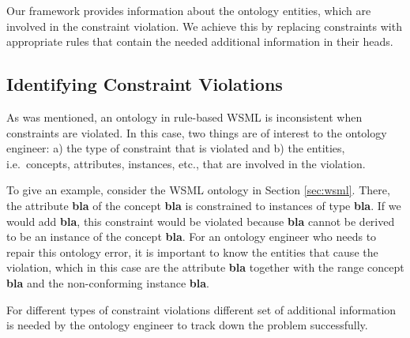 Our framework provides information about the ontology entities, which are involved in the constraint violation. We achieve this by replacing constraints with appropriate rules that contain the needed additional information in their heads.

\subsection{Identifying Constraint Violations}

As was mentioned, an ontology in rule-based WSML is inconsistent when constraints
are violated. In this case, two
things are of interest to the ontology engineer: a) the type of
constraint that is violated and b) the entities, i.e.\ concepts,
attributes, instances, etc., that are involved in the violation.

\def\bla{\textbf{{\sf bla}}\xspace}
To give an example, consider the WSML ontology in Section
\ref{sec:wsml}. There, the attribute \bla of the concept \bla is
constrained to instances of type \bla. If we would add \bla, this
constraint would be violated because \bla cannot be derived to be
an instance of the concept \bla. For an ontology engineer who
needs to repair this ontology error, it is important to know
the entities that cause the violation, which in this case are the
attribute \bla together with the range concept \bla and the
non-conforming instance \bla. 

For different types of constraint violations different set of additional information is needed by the ontology engineer to track down the problem successfully. 

